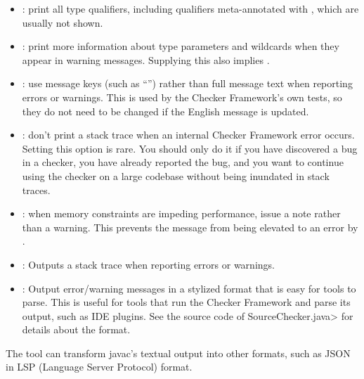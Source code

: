 \begin{itemize}
\item {}: print all type qualifiers, including
qualifiers meta-annotated with , which are
usually not shown.

\item {}: print more information about type
  parameters and wildcards when they appear in warning messages.  Supplying
  this also implies .

\item {}: use message keys (such as ``'')
rather than full message text when reporting errors or warnings.  This is
used by the Checker Framework's own tests, so they do not need to be
changed if the English message is updated.

\item {}: don't print a stack trace when an
internal Checker Framework error occurs.  Setting this option is rare.  You
should only do it if you have discovered a bug in a checker, you have
already reported the bug, and you want to continue using the checker on a
large codebase without being inundated in stack traces.

\item {}: when memory constraints are
impeding performance, issue a note rather than a warning.
This prevents the message from being elevated to an error by .

\item {}: Outputs a stack trace when reporting errors or warnings.

\end{itemize}



\begin{itemize}

\item {}: Output error/warning messages in a
  stylized format that is easy for tools to parse.  This is useful for
  tools that run the Checker Framework and parse its output, such as IDE
  plugins.  See the source code of \<SourceChecker.java> for details about
  the format.

\end{itemize}

The
tool can transform javac's textual output into other formats, such as JSON
in LSP (Language Server Protocol) format.


